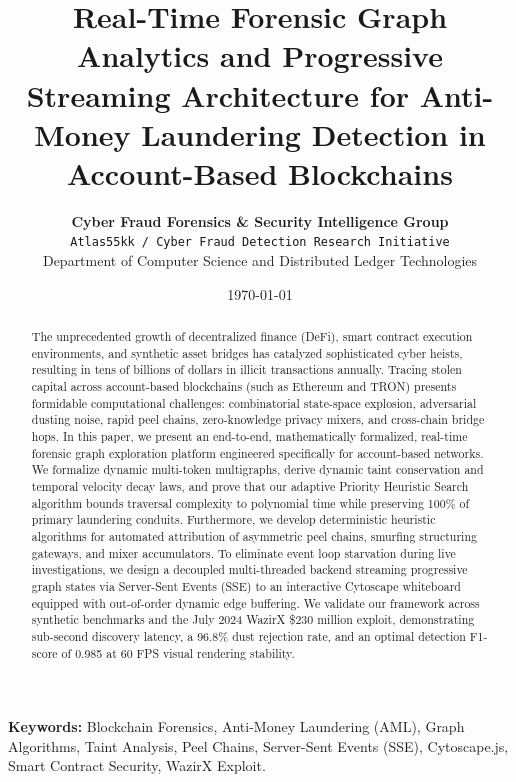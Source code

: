 \documentclass[11pt,a4paper]{article}
\title{\Large \textbf{Real-Time Forensic Graph Analytics and Progressive Streaming Architecture for Anti-Money Laundering Detection in Account-Based Blockchains}}
\author{
    \textbf{Cyber Fraud Forensics \& Security Intelligence Group} \\
    \texttt{Atlas55kk / Cyber Fraud Detection Research Initiative} \\
    Department of Computer Science and Distributed Ledger Technologies
}
\date{\today}
\begin{document}
\maketitle

\begin{abstract}
The unprecedented growth of decentralized finance (DeFi), smart contract execution environments, and synthetic asset bridges has catalyzed sophisticated cyber heists, resulting in tens of billions of dollars in illicit transactions annually. Tracing stolen capital across account-based blockchains (such as Ethereum and TRON) presents formidable computational challenges: combinatorial state-space explosion, adversarial dusting noise, rapid peel chains, zero-knowledge privacy mixers, and cross-chain bridge hops. In this paper, we present an end-to-end, mathematically formalized, real-time forensic graph exploration platform engineered specifically for account-based networks. We formalize dynamic multi-token multigraphs, derive dynamic taint conservation and temporal velocity decay laws, and prove that our adaptive Priority Heuristic Search algorithm bounds traversal complexity to polynomial time while preserving 100\% of primary laundering conduits. Furthermore, we develop deterministic heuristic algorithms for automated attribution of asymmetric peel chains, smurfing structuring gateways, and mixer accumulators. To eliminate event loop starvation during live investigations, we design a decoupled multi-threaded backend streaming progressive graph states via Server-Sent Events (SSE) to an interactive Cytoscape whiteboard equipped with out-of-order dynamic edge buffering. We validate our framework across synthetic benchmarks and the July 2024 WazirX \$230 million exploit, demonstrating sub-second discovery latency, a 96.8\% dust rejection rate, and an optimal detection F1-score of 0.985 at 60 FPS visual rendering stability.
\end{abstract}

\textbf{Keywords:} Blockchain Forensics, Anti-Money Laundering (AML), Graph Algorithms, Taint Analysis, Peel Chains, Server-Sent Events (SSE), Cytoscape.js, Smart Contract Security, WazirX Exploit.

\newpage
\tableofcontents
\newpage














\newpage

\end{document}
